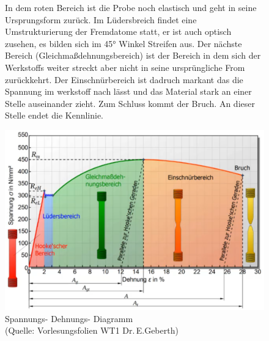 \documentclass[12pt]{scrreprt}
\begin{document}
\begin{figure}[h]
    \begin{minipage}{0.4\textwidth} 
        In dem roten Bereich ist die Probe noch elastisch und geht in seine Ursprungsform zurück.
        Im Lüdersbreich findet eine Umstrukturierung der Fremdatome statt, er ist auch optisch zusehen, es bilden sich im 45° Winkel Streifen aus. 
        Der nächste Bereich (Gleichmaßdehnungsbereich) ist der Bereich in dem sich der Werkstoffs weiter streckt aber nicht in seine ursprüngliche From zurückkehrt.
        Der Einschnürbereich ist dadruch markant das die Spannung im werkstoff nach lässt und das Material stark an einer Stelle auseinander zieht.
        Zum Schluss kommt der Bruch. An dieser Stelle endet die Kennlinie. 
	\end{minipage}
	\hfill
	\begin{minipage}{0.55\textwidth}
	\includegraphics[width=\textwidth]{spannungsdiagramm.png}
	\caption{Spannungs- Dehnungs- Diagramm \\(Quelle: Vorlesungsfolien WT1 Dr.\,E.Geberth)}
	\end{minipage}
\end{figure}
\end{document}
